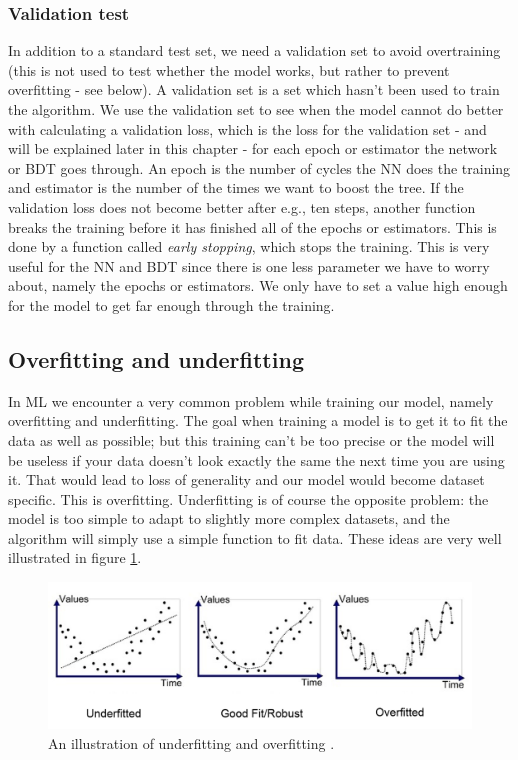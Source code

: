 \subsubsection{Validation test}
In addition to a standard test set, we need a validation set to avoid overtraining (this is not used to test whether the model works, but rather to prevent overfitting - see below). A validation set is a set which hasn't been used to train the algorithm. We use the validation set to see when the model cannot do better with calculating a validation loss, which is the loss for the validation set - and will be explained later in this chapter - for each epoch or estimator the network or BDT goes through. An epoch is the number of cycles the NN does the training and estimator is the number of the times we want to boost the tree. If the validation loss does not become better after e.g., ten steps, another function breaks the training before it has finished all of the epochs or estimators. This is done by a function called \textit{early stopping}, which stops the training. This is very useful for the NN and BDT since there is one less parameter we have to worry about, namely the epochs or estimators. We only have to set a value high enough for the model to get far enough through the training. 

\subsection{Overfitting and underfitting}
In ML we encounter a very common problem while training our model, namely overfitting and underfitting. The goal when training a model is to get it to fit the data as well as possible; but this training can't be too precise or the model will be useless if your data doesn't look exactly the same the next time you are using it. That would lead to loss of generality and our model would become dataset specific. This is overfitting. Underfitting is of course the opposite problem: the model is too simple to adapt to slightly more complex datasets, and the algorithm will simply use a simple function to fit data. These ideas are very well illustrated in figure \ref{fig:overunderfitting}. 

\begin{figure}[H]
    \centering
    \includegraphics[width = \textwidth]{Figures/FromOnline/overunderfitting.png}
    \caption{An illustration of underfitting and overfitting \cite{overunderfittingpic}.}
    \label{fig:overunderfitting}
\end{figure}


